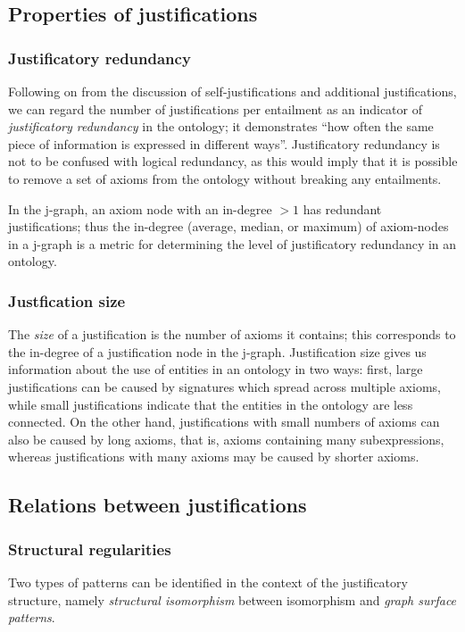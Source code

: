 \subsection{Properties of justifications}

\subsubsection{Justificatory redundancy} 

Following on from the discussion of self-justifications and additional justifications, we can regard the number of justifications per entailment as an indicator of \emph{justificatory redundancy} in the ontology; it demonstrates \enquote{how often the same piece of information is expressed in different ways}. Justificatory redundancy is not to be confused with logical redundancy, as this would imply that it is possible to remove a set of axioms from the ontology without breaking any entailments.

In the j-graph, an axiom node with an in-degree $>1$ has redundant justifications; thus the in-degree (average, median, or maximum) of axiom-nodes in a j-graph is a metric for determining the level of justificatory redundancy in an ontology.


\subsubsection{Justfication size}

The \emph{size} of a justification is the number of axioms it contains; this corresponds to the in-degree of a justification node in the j-graph. Justification size gives us information about the use of entities in an ontology in two ways: first, large justifications can be caused by signatures which spread across multiple axioms, while small justifications indicate that the entities in the ontology are less connected. On the other hand, justifications with small numbers of axioms can also be caused by long axioms, that is, axioms containing many subexpressions, whereas justifications with many axioms may be caused by shorter axioms.

\subsection{Relations between justifications}

\subsubsection{Structural regularities} 
Two types of patterns can be identified in the context of the justificatory structure, namely \emph{structural isomorphism} between isomorphism and \emph{graph surface patterns}.

